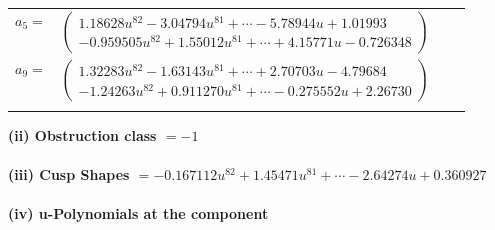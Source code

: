 \documentclass[1p]{elsarticle_modified}
\theoremstyle{definition}
\begin{document}
\begin{tabular}{m{7pt} m{180pt} m{7pt} m{180pt} }
\flushright $a_{5}=$&$\begin{pmatrix}1.18628 u^{82}-3.04794 u^{81}+\cdots-5.78944 u+1.01993\\-0.959505 u^{82}+1.55012 u^{81}+\cdots+4.15771 u-0.726348\end{pmatrix}$ \\
\flushright $a_{9}=$&$\begin{pmatrix}1.32283 u^{82}-1.63143 u^{81}+\cdots+2.70703 u-4.79684\\-1.24263 u^{82}+0.911270 u^{81}+\cdots-0.275552 u+2.26730\end{pmatrix}$\\&\end{tabular}
\flushleft \textbf{(ii) Obstruction class $= -1$}\\~\\
\flushleft \textbf{(iii) Cusp Shapes $= -0.167112 u^{82}+1.45471 u^{81}+\cdots-2.64274 u+0.360927$}\\~\\
\newpage\renewcommand{\arraystretch}{1}
\flushleft \textbf{(iv) u-Polynomials at the component}\newline \\
\end{document}
